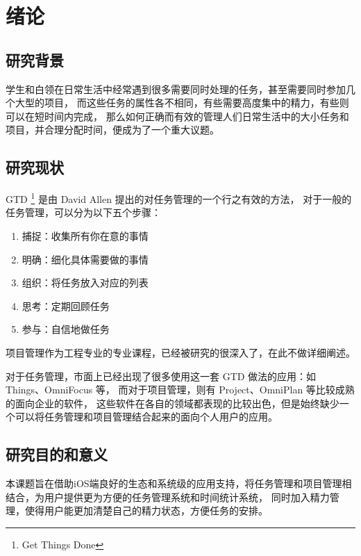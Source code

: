 
\chapter{绪论}
\label{chap:intro}

\section{研究背景}

学生和白领在日常生活中经常遇到很多需要同时处理的任务，甚至需要同时参加几个大型的项目，
而这些任务的属性各不相同，有些需要高度集中的精力，有些则可以在短时间内完成，
那么如何正确而有效的管理人们日常生活中的大小任务和项目，并合理分配时间，便成为了一个重大议题。

\section{研究现状}
GTD \footnote{Get Things Done} 是由 David Allen 提出的对任务管理的一个行之有效的方法，
对于一般的任务管理，可以分为以下五个步骤：
\begin{enumerate}
	\item 捕捉：收集所有你在意的事情
	\item 明确：细化具体需要做的事情
	\item 组织：将任务放入对应的列表
	\item 思考：定期回顾任务
	\item 参与：自信地做任务
\end{enumerate}

项目管理作为工程专业的专业课程，已经被研究的很深入了，在此不做详细阐述。

对于任务管理，市面上已经出现了很多使用这一套 GTD 做法的应用：如 Things、OmniFocus 等，
而对于项目管理，则有 Project、OmniPlan 等比较成熟的面向企业的软件，
这些软件在各自的领域都表现的比较出色，但是始终缺少一个可以将任务管理和项目管理结合起来的面向个人用户的应用。

\section{研究目的和意义}
本课题旨在借助iOS端良好的生态和系统级的应用支持，将任务管理和项目管理相结合，为用户提供更为方便的任务管理系统和时间统计系统，
同时加入精力管理，使得用户能更加清楚自己的精力状态，方便任务的安排。

